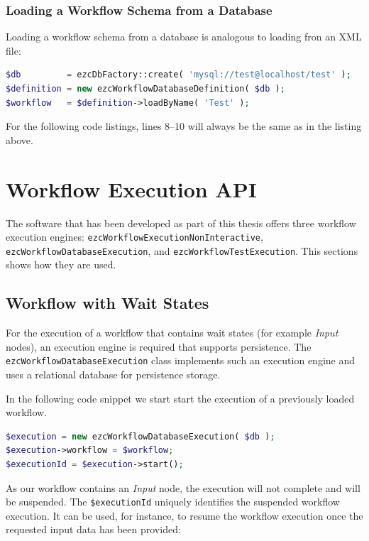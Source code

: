 \subsubsection{Loading a Workflow Schema from a Database}

Loading a workflow schema from a database is analogous to loading fron an XML
file:

\begin{lstlisting}[language=PHP,firstnumber=8]
$db         = ezcDbFactory::create( 'mysql://test@localhost/test' );
$definition = new ezcWorkflowDatabaseDefinition( $db );
$workflow   = $definition->loadByName( 'Test' );
\end{lstlisting}

For the following code listings, lines 8--10 will always be the same as in the
listing above.

\section{Workflow Execution API}

The software that has been developed as part of this thesis offers three
workflow execution engines: \texttt{ezcWorkflowExecutionNonInteractive},
\texttt{ezcWorkflowDatabaseExecution}, and \texttt{ezcWorkflowTestExecution}.
This sections shows how they are used.

\subsection{Workflow with Wait States}

For the execution of a workflow that contains wait states (for example
\emph{Input} nodes), an execution engine is required that supports
persistence. The \texttt{ezcWorkflowDatabaseExecution} class implements
such an execution engine and uses a relational database for persistence
storage.

In the following code snippet we start start the execution of a previously
loaded workflow.

\begin{lstlisting}[language=PHP,firstnumber=11]
$execution = new ezcWorkflowDatabaseExecution( $db );
$execution->workflow = $workflow;
$executionId = $execution->start();
\end{lstlisting}

As our workflow contains an \emph{Input} node, the execution will not complete
and will be suspended. The \texttt{\$executionId} uniquely identifies the
suspended workflow execution. It can be used, for instance, to resume the
workflow execution once the requested input data has been provided:

